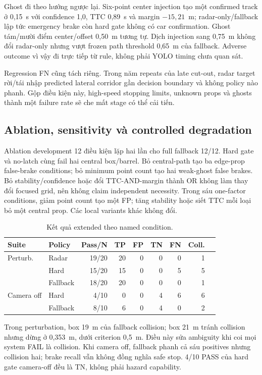 \documentclass[conference]{IEEEtran}
\begin{document}
Ghost đi theo hướng ngược lại. Six-point center injection tạo một confirmed track
ở 0,15~s với confidence 1,0, TTC 0,89~s và margin $-15,21$~m; radar-only/fallback
lập tức emergency brake còn hard gate không có car confirmation. Ghost tám/mười
điểm center/offset 0,50~m tương tự. Dịch injection sang 0,75~m không đổi radar-only
nhưng vượt frozen path threshold 0,65~m của fallback. Adverse outcome vì vậy đi
trực tiếp từ rule, không phải YOLO timing chưa quan sát.

Regression FN cũng tách riêng. Trong năm repeats của late cut-out, radar target
rời/tái nhập predicted lateral corridor gần decision boundary và không policy
nào phanh. Gộp điều kiện này, high-speed stopping limits, unknown props và ghosts
thành một failure rate sẽ che mất stage có thể cải tiến.

\subsection{Ablation, sensitivity và controlled degradation}
Ablation development 12 điều kiện lặp hai lần cho full fallback 12/12. Hard gate
và no-latch cùng fail hai central box/barrel. Bỏ central-path tạo ba edge-prop
false-brake conditions; bỏ minimum point count tạo hai weak-ghost false brakes.
Bỏ stability/confidence hoặc đổi TTC-AND-margin thành OR không làm thay đổi focused
grid, nên không claim independent necessity. Trong sáu one-factor conditions,
giảm point count tạo một FP; tăng stability hoặc siết TTC mỗi loại bỏ một central
prop. Các local variants khác không đổi.

\begin{table}[t]
\caption{Kết quả extended theo named condition.}
\label{tab:extended}
\centering\scriptsize
\setlength{\tabcolsep}{3pt}
\begin{tabular}{llrrrrrrr}
\toprule Suite & Policy & Pass/N & TP & FP & TN & FN & Coll.\\ \midrule
Perturb. & Radar & 19/20 & 20 & 0 & 0 & 0 & 1\\
 & Hard & 15/20 & 15 & 0 & 0 & 5 & 5\\
 & Fallback & 18/20 & 20 & 0 & 0 & 0 & 1\\
\midrule
Camera off & Hard & 4/10 & 0 & 0 & 4 & 6 & 6\\
 & Fallback & 8/10 & 6 & 0 & 4 & 0 & 2\\
\bottomrule
\end{tabular}
\end{table}

Trong perturbation, box 19~m của fallback collision; box 21~m tránh collision
nhưng dừng ở 0,353~m, dưới criterion 0,5~m. Điều này sửa ambiguity khi coi mọi
system FAIL là collision. Khi camera off, fallback phanh cả sáu positives nhưng
collision hai; brake recall vẫn không đồng nghĩa safe stop. 4/10 PASS của hard
gate camera-off đều là TN, không phải hazard capability.
\end{document}
